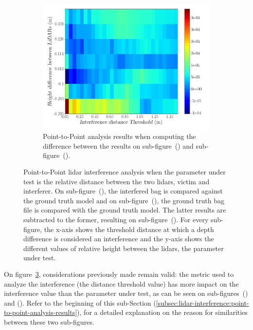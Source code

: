 \begin{figure}[!ht]
\begin{subfigure}[c]{0.45\textwidth}
	\label{fig:height:ground-truth-color-mesh}
\end{subfigure}
\\ \vspace{4mm}
\begin{subfigure}[c]{0.8\textwidth}
	\includegraphics[width=\textwidth]{img/lidar-interference/height/difference_ground_truth_interference_measurement.png}
	\caption{Point-to-Point analysis results when computing the difference between the results on sub-figure~() and sub-figure~().}
	\label{fig:height:difference-color-mesh}
\end{subfigure}

\caption{Point-to-Point \ac{lidar} interference analysis when the parameter under test is the relative distance between the two \acp{lidar}, victim and interferer. On sub-figure~(), the interfered bag is compared against the ground truth model and on sub-figure~(), the ground truth bag file is compared with the ground truth model. The latter results are subtracted to the former, resulting on sub-figure~(). For every sub-figure, the x-axis shows the threshold distance at which a depth difference is considered an interference and the y-axis shows the different values of relative height between the \acp{lidar}, the parameter under test.}
\label{fig:height:color-mesh}
\end{figure}


On figure~\ref{fig:height:color-mesh}, considerations previously made remain valid: the metric used to analyze the interference (the distance threshold value) has more impact on the interference value than the parameter under test, as can be seen on sub-figures~() and (). Refer to the beginning of this sub-Section (\ref{subsec:lidar-interference:point-to-point-analysis-results}), for a detailed explanation on the reason for similarities between these two sub-figures. 


